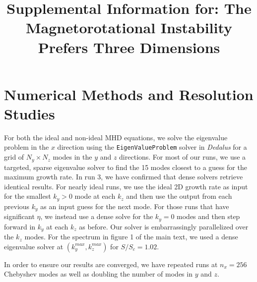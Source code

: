 \documentclass[aps,prl,preprint
,superscriptaddress]{revtex4-1}
\newcommand{\SSC}{S/S_{c}}
\begin{document}

\title{Supplemental Information for: The Magnetorotational Instability Prefers Three Dimensions}

\maketitle
\section{Numerical Methods and Resolution Studies}
\label{sec:methods}

For both the ideal and non-ideal MHD equations, we solve the eigenvalue problem in the $x$ direction using the \texttt{EigenValueProblem} solver in \emph{Dedalus} for a grid of $N_y \times N_z$ modes in the $y$ and $z$ directions.
For most of our runs, we use a targeted, sparse eigenvalue solver to find the 15 modes closest to a guess for the maximum growth rate.
In run 3, we have confirmed that dense solvers retrieve identical results.
For nearly ideal runs, we use the ideal 2D growth rate as input for the smallest $k_y > 0$ mode at each $k_z$ and then use the output from each previous $k_y$ as an input guess for the next mode.
For those runs that have significant $\eta$, we instead use a dense solve for the $k_y = 0$ modes and then step forward in $k_y$ at each $k_z$ as before.
Our solver is embarrassingly parallelized over the $k_z$ modes.
For the spectrum in figure 1 of the main text, we used a dense eigenvalue solver at $(k_y^{max},k_z^{max})$ for $\SSC= 1.02$.

In order to ensure our results are converged, we have repeated runs at $n_x=256$ Chebyshev modes as well as doubling the number of modes in $y$ and $z$.
\end{document}
